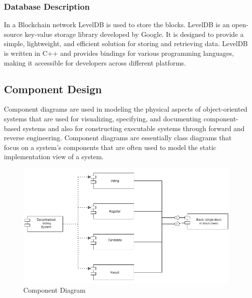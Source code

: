 \documentclass[oneside, 12pt]{book}
\begin{document}
\subsubsection{Database Description}
In a Blockchain network LevelDB is used to store the blocks. LevelDB is an open-source key-value storage library developed by Google. It is designed to provide a simple, lightweight, and efficient solution for storing and retrieving data. LevelDB is written in C++ and provides bindings for various programming languages, making it accessible for developers across different platforms.
\subsection{Component Design}
Component diagrams are used in modeling the physical aspects of object-oriented systems that are used for visualizing, specifying, and documenting component- based systems and also for constructing executable systems through forward and reverse engineering. Component diagrams are essentially class diagrams that focus on a system’s components that are often used to model the static implementation view of a system.
\begin{figure}[H]
	\centering
	\includegraphics[width=\linewidth]{./Resources/component.png}
	\caption{Component Diagram}
	\label{fig:component}
\end{figure}
\newpage
\end{document}
